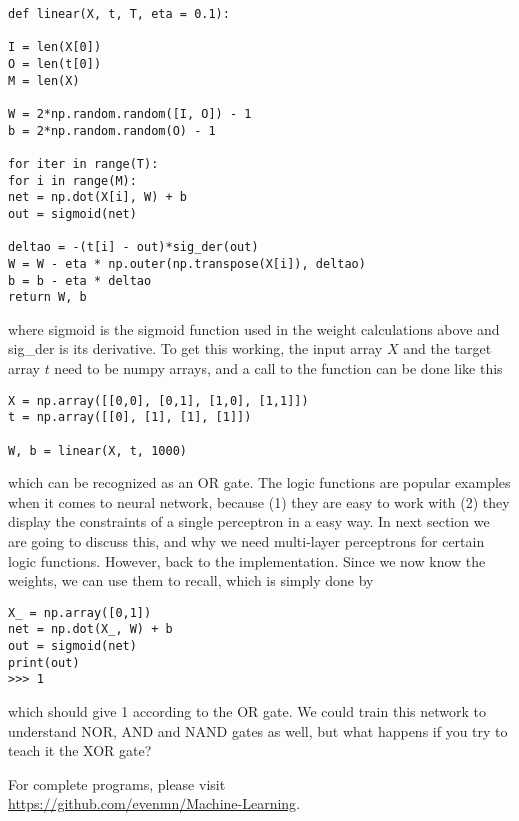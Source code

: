 \lstset{basicstyle=\scriptsize}
\begin{lstlisting}
def linear(X, t, T, eta = 0.1):

I = len(X[0])
O = len(t[0])
M = len(X)

W = 2*np.random.random([I, O]) - 1
b = 2*np.random.random(O) - 1

for iter in range(T):
for i in range(M):
net = np.dot(X[i], W) + b
out = sigmoid(net)

deltao = -(t[i] - out)*sig_der(out)
W = W - eta * np.outer(np.transpose(X[i]), deltao)
b = b - eta * deltao
return W, b

\end{lstlisting}
where sigmoid is the sigmoid function used in the weight calculations above and sig\_der is its derivative. To get this working, the input array $X$ and the target array $t$ need to be numpy arrays, and a call to the function can be done like this
\begin{lstlisting}
X = np.array([[0,0], [0,1], [1,0], [1,1]])
t = np.array([[0], [1], [1], [1]])

W, b = linear(X, t, 1000)
\end{lstlisting}
which can be recognized as an OR gate. The logic functions are popular examples when it comes to neural network, because (1) they are easy to work with (2) they display the constraints of a single perceptron in a easy way. In next section we are going to discuss this, and why we need multi-layer perceptrons for certain logic functions. However, back to the implementation. Since we now know the weights, we can use them to recall, which is simply done by
\begin{lstlisting}
X_ = np.array([0,1])
net = np.dot(X_, W) + b
out = sigmoid(net)
print(out)
>>> 1
\end{lstlisting}
which should give 1 according to the OR gate. We could train this network to understand NOR, AND and NAND gates as well, but what happens if you try to teach it the XOR gate? 

For complete programs, please visit \\ \url{https://github.com/evenmn/Machine-Learning}.